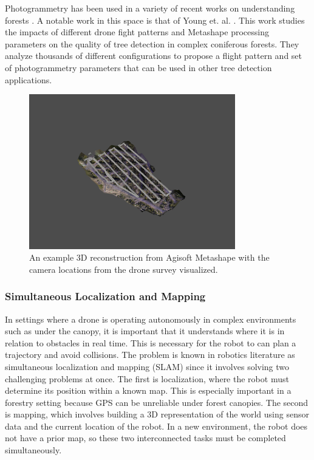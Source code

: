 Photogrammetry has been used in a variety of recent works on understanding forests \cite{Swayze2021InfluenceDensity, doi:10.1139/cjfr-2020-0433}. A notable work in this space is that of Young et. al. \cite{Young2022}. This work studies the impacts of different drone fight patterns and Metashape processing parameters on the quality of tree detection in complex coniferous forests. They analyze thousands of different configurations to propose a flight pattern and set of photogrammetry parameters that can be used in other tree detection applications.
\begin{figure}
    \centering
    \includegraphics[width=0.8\textwidth, trim={4cm 3cm 4cm 4cm}, clip]{figs/methods/structure_from_motion/camera estimation.png}
    \caption{An example 3D reconstruction from Agisoft Metashape \cite{AgisoftMetashape} with the camera locations from the drone survey visualized.}
    \label{fig:background:camera_locations}
\end{figure}


\subsubsection{Simultaneous Localization and Mapping}
In settings where a drone is operating autonomously in complex environments such as under the canopy, it is important that it understands where it is in relation to obstacles in real time. This is necessary for the robot to can plan a trajectory and avoid collisions. The problem is known in robotics literature as simultaneous localization and mapping (SLAM) \cite{durrant2006simultaneous} since it involves solving two challenging problems at once. The first is localization, where the robot must determine its position within a known map. This is especially important in a forestry setting because GPS can be unreliable under forest canopies. The second is mapping, which involves building a 3D representation of the world using sensor data and the current location of the robot. In a new environment, the robot does not have a prior map, so these two interconnected tasks must be completed simultaneously.


